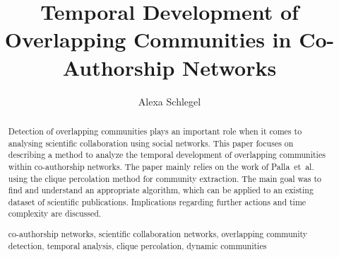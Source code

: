 \documentclass[runningheads,a4paper]{llncs}
\newcommand{\keywords}[1]{\par\addvspace\baselineskip
\noindent\keywordname\enspace\ignorespaces#1}
\begin{document}
\mainmatter  %

\title{Temporal Development of Overlapping Communities in Co-Authorship Networks}


%
%
\author{Alexa Schlegel%
}
%


%
%

\maketitle


\begin{abstract}
Detection of overlapping communities plays an important role when it comes to analysing scientific collaboration using social networks. This paper focuses on describing a method to analyze the temporal development of overlapping communities within co-authorship networks. The paper mainly relies on the work of Palla~et~al. using the clique percolation method for community extraction. The main goal was to find and understand an appropriate algorithm, which can be applied to an existing dataset of scientific publications. Implications regarding further actions and time complexity are discussed.

\keywords{co-authorship networks, scientific collaboration networks, overlapping community detection, temporal analysis, clique percolation, dynamic communities}
\end{abstract}
\end{document}
